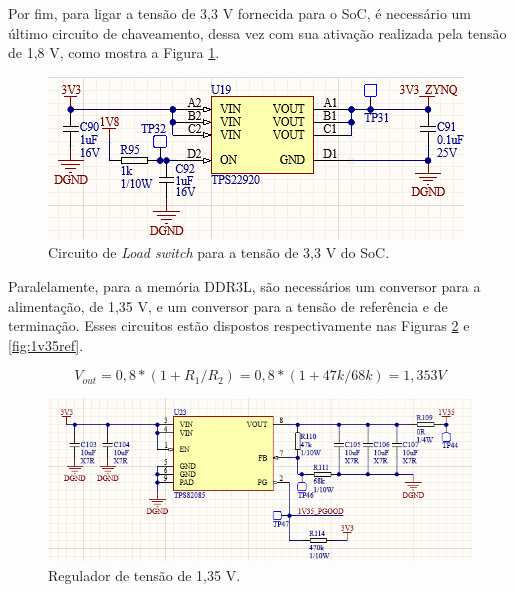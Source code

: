 Por fim, para ligar a tensão de 3,3 V fornecida para o SoC, é necessário um último circuito de chaveamento, dessa vez com sua ativação realizada pela tensão de 1,8 V, como mostra a Figura \ref{fig:sw2}.

\begin{figure}[H]
    \centering
    \includegraphics[scale=1]{images/sw2.png}
    \caption{Circuito de \textit{Load switch} para a tensão de 3,3 V do SoC.}
    \label{fig:sw2}
\end{figure}

Paralelamente, para a memória DDR3L, são necessários um conversor para a alimentação, de 1,35 V, e um conversor para a tensão de referência e de terminação. Esses circuitos estão dispostos respectivamente nas Figuras \ref{fig:1v35supp} e \ref{fig:1v35ref}.

\begin{equation}
	V_{out} = 0,8 * (1 + R_1/R_2) = 0,8 * (1+ 47k/68k) = 1,353 V
\end{equation} 

\begin{figure}[H]
    \centering
    \includegraphics[scale=0.8]{images/1v35supp.png}
    \caption{Regulador de tensão de 1,35 V.}
    \label{fig:1v35supp}
\end{figure}

